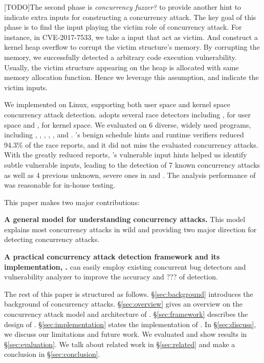 [TODO]The second phase is \emph{concurrency fuzzer?} to provide another hint to 
indicate extra inputs for constructing a concurrency attack. 
The key goal of this phase is to find the input playing the victim role of 
concurrency attack. For instance, in CVE-2017-7533, we take a input that 
act as victim. And construct a kernel heap overflow to corrupt the victim structure's 
memory. By corrupting the memory, we successfully detected a arbitrary code 
execution vulnerability. Usually, the victim structure appearing on the heap
 is allocated with same memory allocation function. Hence we leverage this assumption, 
 and indicate the victim inputs. 
 


We implemented \xxx on Linux, supporting both user space and kernel space concurrency attack detection. 
\xxx adopts several race detectors including \tsan, \valgrind for user space and 
\ktsan, \ski for kernel space. We evaluated \xxx on 6 diverse, widely used programs, including \apache, \chrome, \libsafe, \linux, \mysql,
and \ssdb. \xxx’s benign schedule hints and runtime verifiers reduced 94.3\% of the race reports, 
and it did not miss the evaluated concurrency attacks. With the greatly reduced reports,
\xxx’s vulnerable input hints helped us identify subtle
vulnerable inputs, leading to the detection of 7 known concurrency
attacks as well as 4 previous unknown, severe ones
in \ssdb and \apache. The analysis performance of \xxx was
reasonable for in-house testing.


This paper makes two major contributions:

\begin{tightenum}
\item \textbf{A general model for understanding concurrency attacks.} 
This model explains most concurrency attacks in wild and 
providing two major direction for detecting concurrency attacks. 
	
\item \textbf{A practical concurrency attack detection framework and its implementation, \xxx.} 
\xxx can easily employ existing concurrent bug detectors and vulnerability analyzer 
to improve the accuracy and ??? of detection.
	
\end{tightenum}

 

The rest of this paper is structured as follows. 
\S\ref{sec:background} introduces the background of concurrency attacks.
\S\ref{sec:overview} gives an overview on the concurrency attack model and architecture of \xxx.
\S\ref{sec:framework} describes the design of \xxx. 
\S\ref{sec:implementation} states the implementation of \xxx.
In \S\ref{sec:discuss}, we discuss our limitations and future work. 
We evaluated \xxx and show results in \S\ref{sec:evaluation}.
We talk about related work in \S\ref{sec:related} and make a conclusion in \S\ref{sec:conclusion}.





